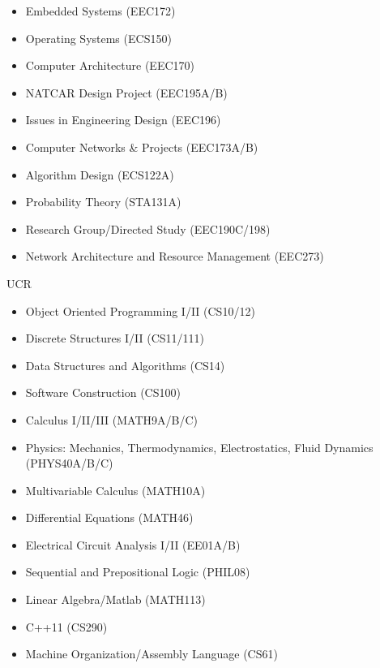 \begin{cvskills}
{\begin{multicols}{3}
\begin{itemize}
          \item Embedded Systems (EEC172)
          \item Operating Systems (ECS150)
          \item Computer Architecture (EEC170)
          \item NATCAR Design Project (EEC195A/B)
          \item Issues in Engineering Design (EEC196)
          \item Computer Networks \& Projects (EEC173A/B)
          \item Algorithm Design (ECS122A)
          \item Probability Theory (STA131A)
          \item Research Group/Directed Study (EEC190C/198)
          \item Network Architecture and Resource Management (EEC273)
        \end{itemize}
      \end{multicols}
    }
  \cvskill
    {UCR} %
    {
      \begin{multicols}{3}
        \begin{itemize}
          \item Object Oriented Programming I/II (CS10/12)
          \item Discrete Structures I/II (CS11/111)
          \item Data Structures and Algorithms (CS14)
          \item Software Construction (CS100)
          \item Calculus I/II/III (MATH9A/B/C)
          \item Physics: Mechanics, Thermodynamics, Electrostatics, Fluid Dynamics (PHYS40A/B/C)
          \item Multivariable Calculus (MATH10A)
          \item Differential Equations (MATH46)
          \item Electrical Circuit Analysis I/II (EE01A/B)
          \item Sequential and Prepositional Logic (PHIL08)
          \item Linear Algebra/Matlab (MATH113)
          \item C++11 (CS290)
          \item Machine Organization/Assembly Language (CS61)
        \end{itemize}
      \end{multicols}
    }
\end{cvskills}